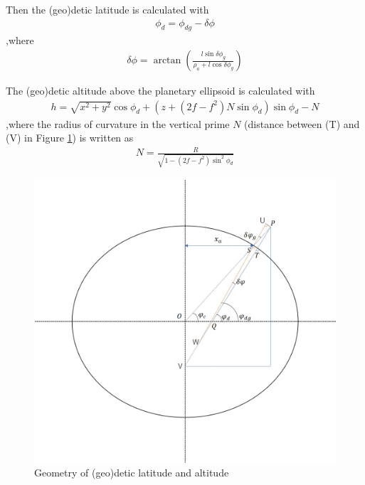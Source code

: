 \documentclass[11pt]{article}
\begin{document}
\noindent Then the (geo)detic latitude is calculated with
\begin{equation}
	\label{eq:phi_d}
	\begin{aligned}
	\phi_d = \phi_{dg} - \delta\phi
	\end{aligned}
\end{equation}
,where
\begin{equation}
	\label{eq:delta_phi}
	\begin{aligned}
	\delta\phi = \arctan{\left(\frac{l\sin{\delta\phi_g}}{\rho_a+l\cos{\delta\phi_g}}\right)}
	\end{aligned}
\end{equation}

\noindent The (geo)detic altitude above the planetary ellipsoid is calculated with
\begin{equation}
	\label{eq:geo_alt}
	\begin{aligned}
	h =\sqrt{x^2+y^2}\cos{\phi_d} + \left(z + (2f-f^2)N\sin{\phi_d}\right)\sin{\phi_d} - N
	\end{aligned}
\end{equation}
,where the radius of curvature in the vertical prime $N$ (distance between (T) and (V) in Figure \ref{fig:1}) is written as
\begin{equation}
	\label{eq:N}
	\begin{aligned}
	N =\frac{R}{\sqrt{1-(2f-f^2)\sin^2{\phi_d}}}
	\end{aligned}
\end{equation}

\begin{figure}
  \includegraphics[width=\linewidth]{fig1.jpg}
  \caption{Geometry of (geo)detic latitude and altitude}
  \label{fig:1}
\end{figure}
\end{document}
